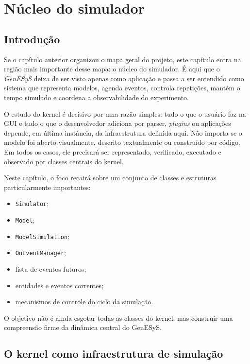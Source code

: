 \chapter{Núcleo do simulador}
\label{chap:nucleo_do_simulador}

\section{Introdução}
\label{sec:cap7_introducao}

Se o capítulo anterior organizou o mapa geral do projeto, este capítulo entra na região mais importante desse mapa: o núcleo do simulador. É aqui que o \textit{GenESyS} deixa de ser visto apenas como aplicação e passa a ser entendido como sistema que representa modelos, agenda eventos, controla repetições, mantém o tempo simulado e coordena a observabilidade do experimento.

O estudo do kernel é decisivo por uma razão simples: tudo o que o usuário faz na GUI e tudo o que o desenvolvedor adiciona por parser, \textit{plugins} ou aplicações depende, em última instância, da infraestrutura definida aqui. Não importa se o modelo foi aberto visualmente, descrito textualmente ou construído por código. Em todos os casos, ele precisará ser representado, verificado, executado e observado por classes centrais do kernel.

Neste capítulo, o foco recairá sobre um conjunto de classes e estruturas particularmente importantes:
\begin{itemize}
    \item \texttt{Simulator};
    \item \texttt{Model};
    \item \texttt{ModelSimulation};
    \item \texttt{OnEventManager};
    \item lista de eventos futuros;
    \item entidades e eventos correntes;
    \item mecanismos de controle do ciclo da simulação.
\end{itemize}

O objetivo não é ainda esgotar todas as classes do kernel, mas construir uma compreensão firme da dinâmica central do GenESyS.

\section{O kernel como infraestrutura de simulação}
\label{sec:cap7_kernel_como_infraestrutura}

